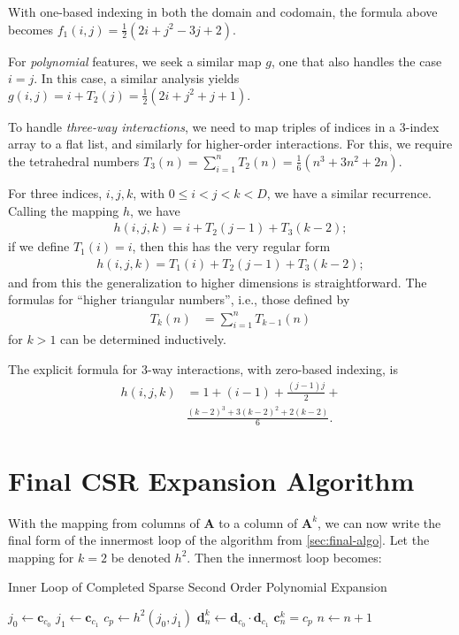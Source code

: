\documentclass{article}
\begin{document}
With one-based indexing in both the domain and codomain, the formula above becomes
$f_1(i, j)  = \frac{1}{2}(2i + j^2 - 3j + 2).$

For \emph{polynomial} features, we seek a similar map $g$, one that also handles the case $i = j$. In this case, a similar analysis yields
$ g(i, j) = i + T_2(j) = \frac{1}{2} (2i + j^2 + j + 1).$


To handle \emph{three-way interactions}, we need to map triples of indices in a 3-index array to a flat list, and similarly for higher-order interactions. For this, we require the tetrahedral numbers $T_3(n) = \sum_{i=1}^n T_{2}(n) = 
\frac{1}{6}(n^3 + 3n^2 + 2n)$.

For three indices, $i,j,k$, with $0 \le i < j < k < D$, we have a similar recurrence. Calling the mapping $h$, we have 
\begin{align}
h(i,j,k) = i + T_2(j-1) + T_3(k-2);
\end{align}
if we define $T_1(i) = i$, then this has the very regular form
\begin{align}
h(i,j,k) =  T_1(i) + T_2(j-1) + T_3(k-2);
\end{align}
and from this the generalization to higher dimensions is straightforward. The formulas for ``higher triangular numbers'', i.e., those defined by
\begin{align}
T_k(n) &= \sum_{i=1}^n T_{k-1}(n)
\end{align}
for $k > 1$ can be determined inductively.

The explicit formula for 3-way interactions, with zero-based indexing, is 
\begin{align}
h(i, j, k) &= 1 + (i-1) + \frac{(j-1)j}{2} + \\
& \frac{(k-2)^3 + 3(k-2)^2 + 2(k-2)}{6}. 
\end{align}

\section{Final CSR Expansion Algorithm}
With the mapping from columns of $\bm{A}$ to a column of $\bm{A}^k$, we can now write the final form of the innermost loop of the algorithm from \ref{sec:final-algo}.
Let the mapping for $k=2$ be denoted $h^2$.
Then the innermost loop becomes:

\begin{algorithm}[H]
   \caption{Inner Loop of Completed Sparse Second Order Polynomial Expansion}
   \label{alg:Inner-Loop-of-Completed-Sparse-Second-Order-Polynomial-Expansion}
\begin{algorithmic}[1]
      \STATE $j_0 \gets \bm{c}_{c_0}$
      \STATE $j_1 \gets \bm{c}_{c_1}$
      \STATE $c_p \gets h^2(j_0, j_1)$
      \STATE $\bm{d}^k_{n} \gets \bm{d}_{c_0} \cdot \bm{d}_{c_1}$
      \STATE $\bm{c}^k_{n} = c_p$
      \STATE $n \gets n + 1$
  \ENDFOR
\end{algorithmic}
\end{algorithm}
\end{document}
